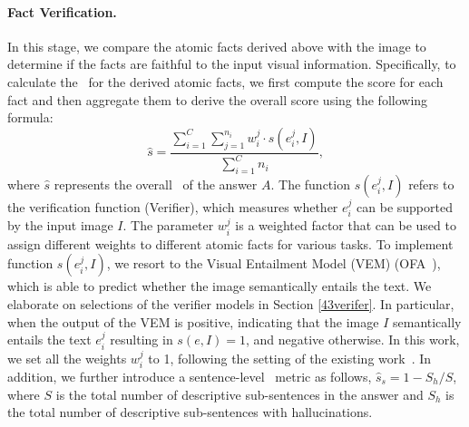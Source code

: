 \paragraph{Fact Verification.}
In this stage, we compare the atomic facts derived above with the image to determine if the facts are faithful to the input visual information. Specifically, to calculate the \ours\ for the derived atomic facts, we first compute the score for each fact and then aggregate them to derive the overall score using the following formula:
\begin{equation}
\hat{s} = \frac{\sum_{i=1}^{C} \sum_{j=1}^{n_i} {w_i^j \cdot s (e_i^j, I )} }{ \sum_{i=1}^{C} {n_i} },
\end{equation}
where $\hat{s}$ represents the overall \ours\ of the answer $A$. The function $s(e_i^j, I)$ refers to the verification function (\ie Verifier), which measures whether $e_i^j$ can be supported by the input image $I$. The parameter $w_i^j$ is a weighted factor that can be used to assign different weights to different atomic facts for various tasks. 
To implement function $s(e_i^j, I)$, we resort to the Visual Entailment Model (VEM) (\eg OFA~\cite{ofa}), which is able to predict whether the image semantically entails the text. We elaborate on selections of the verifier models in Section \ref{43verifer}.
In particular, when the output of the VEM is positive, indicating that the image $I$ semantically entails the text $e_i^j$ resulting in $s(e,I)=1$, and negative otherwise. 
In this work, we set all the weights $w_i^j$ to 1, following the setting of the existing work~\cite{factscore,DBLP:conf/eacl/KrishnaBKIDCL23}. 
In addition, we further introduce a sentence-level \ours\ metric as follows, $\hat{s}_s = 1 - S_h/{S}$, 
where $S$ is the total number of descriptive sub-sentences in the answer and $S_h$ is the total number of descriptive sub-sentences with hallucinations.
